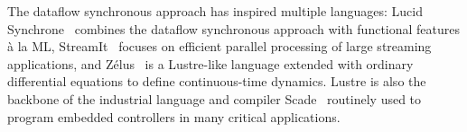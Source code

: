 The dataflow synchronous approach has inspired
multiple languages: Lucid Synchrone~\cite{lucid_2006} combines the
dataflow synchronous approach with functional features \`a la ML,
StreamIt~\cite{streamit_2002} focuses on efficient parallel processing of large
streaming applications, and Z\'elus~\cite{zelus_2013} is a Lustre-like
language extended with ordinary differential equations to define
contin\-uous-time dynamics. Lustre is also the backbone of the
industrial language and compiler Scade~\cite{scade_2017} routinely
used to program embedded controllers in many critical applications.
